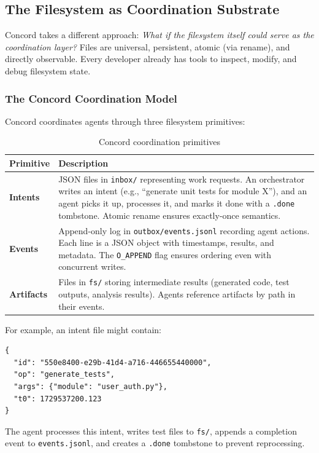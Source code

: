 \documentclass[11pt]{article}
\begin{document}
\subsection{The Filesystem as Coordination Substrate}

Concord takes a different approach: \textit{What if the filesystem itself could serve as the coordination layer?} Files are universal, persistent, atomic (via rename), and directly observable. Every developer already has tools to inspect, modify, and debug filesystem state.

\subsubsection{The Concord Coordination Model}

Concord coordinates agents through three filesystem primitives:

\begin{table}[h]
\centering
\begin{tabular}{p{3cm}p{10cm}}
\toprule
\textbf{Primitive} & \textbf{Description} \\
\midrule
\textbf{Intents} & JSON files in \texttt{inbox/} representing work requests. An orchestrator writes an intent (e.g., ``generate unit tests for module X''), and an agent picks it up, processes it, and marks it done with a \texttt{.done} tombstone. Atomic rename ensures exactly-once semantics. \\
\textbf{Events} & Append-only log in \texttt{outbox/events.jsonl} recording agent actions. Each line is a JSON object with timestamps, results, and metadata. The \texttt{O\_APPEND} flag ensures ordering even with concurrent writes. \\
\textbf{Artifacts} & Files in \texttt{fs/} storing intermediate results (generated code, test outputs, analysis results). Agents reference artifacts by path in their events. \\
\bottomrule
\end{tabular}
\caption{Concord coordination primitives}
\end{table}

For example, an intent file might contain:
\begin{lstlisting}
{
  "id": "550e8400-e29b-41d4-a716-446655440000",
  "op": "generate_tests",
  "args": {"module": "user_auth.py"},
  "t0": 1729537200.123
}
\end{lstlisting}

The agent processes this intent, writes test files to \texttt{fs/}, appends a completion event to \texttt{events.jsonl}, and creates a \texttt{.done} tombstone to prevent reprocessing.
\end{document}
